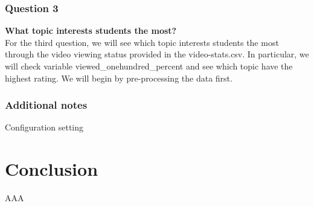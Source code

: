 \documentclass[12pt,]{article}
\begin{document}
\hypertarget{question-3}{%
\subsubsection{Question 3}\label{question-3}}

\textbf{What topic interests students the most?}\\
\hfill\break For the third question, we will see which topic interests
students the most through the video viewing status provided in the
video-stats.csv. In particular, we will check variable
viewed\_onehundred\_percent and see which topic have the highest rating.
We will begin by pre-processing the data first.

\hypertarget{additional-notes}{%
\subsubsection{Additional notes}\label{additional-notes}}

Configuration setting

\hypertarget{conclusion}{%
\section{Conclusion}\label{conclusion}}

AAA





\newpage
\singlespacing 

\end{document}
